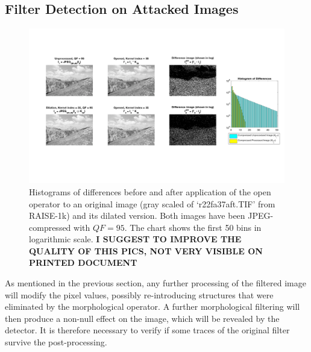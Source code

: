\documentclass[review]{elsarticle}
\begin{document}
\subsection{Filter Detection on Attacked Images}
\label{sec:compr_img}
\begin{figure}[!ht]%
	\centering
	\includegraphics[width=\linewidth]{example}
	\caption{Histograms of differences before and after application of the open operator to an original image (gray scaled of `r22fa37aft.TIF' from RAISE-1k) and its dilated version. Both images have been JPEG-compressed with $QF = 95$. The chart shows the first 50 bins in logarithmic scale. \textbf{I SUGGEST TO IMPROVE THE QUALITY OF THIS PICS, NOT VERY VISIBLE ON PRINTED DOCUMENT}}
	\label{fig:hist_ero}
\end{figure}

As mentioned in the previous section, any further processing of the filtered image will modify the pixel values, possibly re-introducing structures that were eliminated by the morphological operator. A further morphological filtering will then produce a non-null effect on the image, which will be revealed by the detector. It is therefore necessary to verify if some traces of the original filter survive the post-processing.
\end{document}
